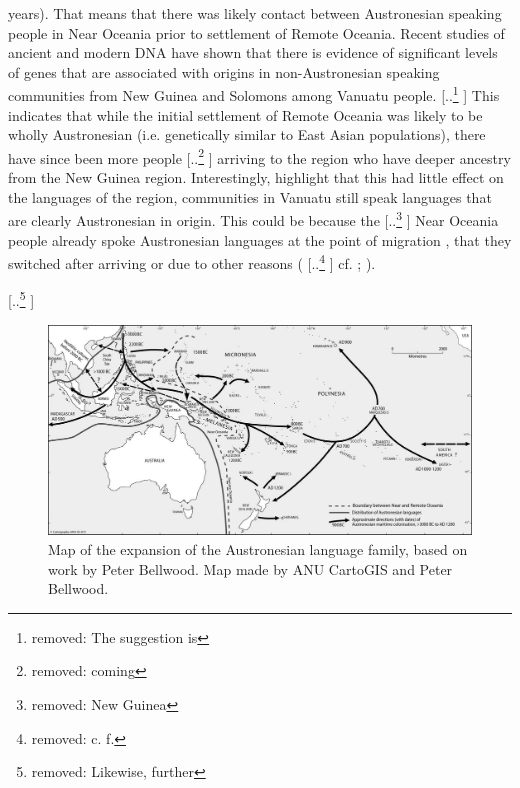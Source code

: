 \documentclass[unnumsec,webpdf,modern,medium]{oup-authoring-template}
\providecommand{\DIFaddtex}[1]{{\protect\color{blue} \sf #1}} %
\providecommand{\DIFdeltex}[1]{{\protect\color{red} [..\footnote{removed: #1} ]}} %
\providecommand{\DIFaddbegin}{} %
\providecommand{\DIFaddend}{} %
\providecommand{\DIFdelbegin}{} %
\providecommand{\DIFdelend}{} %
\providecommand{\DIFaddFL}[1]{\DIFadd{#1}} %
\providecommand{\DIFadd}[1]{\texorpdfstring{\DIFaddtex{#1}}{#1}} %
\providecommand{\DIFdel}[1]{\texorpdfstring{\DIFdeltex{#1}}{}} %
\newcommand{\DIFscaledelfig}{0.5}
\newlength{\DIFdelgraphicswidth} %
\newlength{\DIFdelgraphicsheight} %
\newcommand{\DIFaddincludegraphics}[2][]{{\color{blue}\fbox{\DIFOincludegraphics[#1]{#2}}}} %
\newcommand{\DIFdelincludegraphics}[2][]{%
\sbox{\DIFdelgraphicsbox}{\DIFOincludegraphics[#1]{#2}}%
\settoboxwidth{\DIFdelgraphicswidth}{\DIFdelgraphicsbox} %
\settoboxtotalheight{\DIFdelgraphicsheight}{\DIFdelgraphicsbox} %
\scalebox{\DIFscaledelfig}{%
\parbox[b]{\DIFdelgraphicswidth}{\usebox{\DIFdelgraphicsbox}\\[-\baselineskip] \rule{\DIFdelgraphicswidth}{0em}}\llap{\resizebox{\DIFdelgraphicswidth}{\DIFdelgraphicsheight}{%
\setlength{\unitlength}{\DIFdelgraphicswidth}%
\begin{picture}(1,1)%
\thicklines\linethickness{2pt} %
{\color[rgb]{1,0,0}\put(0,0){\framebox(1,1){}}}%
{\color[rgb]{1,0,0}\put(0,0){\line( 1,1){1}}}%
{\color[rgb]{1,0,0}\put(0,1){\line(1,-1){1}}}%
\end{picture}%
}\hspace*{3pt}}} %
} %
\DeclareRobustCommand{\DIFaddbegin}{\DIFOaddbegin \let\includegraphics\DIFaddincludegraphics} %
\DeclareRobustCommand{\DIFaddend}{\DIFOaddend \let\includegraphics\DIFOincludegraphics} %
\DeclareRobustCommand{\DIFdelbegin}{\DIFOdelbegin \let\includegraphics\DIFdelincludegraphics} %
\DeclareRobustCommand{\DIFdelend}{\DIFOaddend \let\includegraphics\DIFOincludegraphics} %
\begin{document}
\DIFdelend \DIFaddbegin \DIFadd{000 years). That means that there was likely contact between Austronesian speaking people in Near Oceania prior to settlement of Remote Oceania. }\DIFaddend Recent studies of ancient and modern DNA \citep{lipson_harvad_ancient_dna_vanuatu_2018, posth_jena_ancient_dna_vanuatu_2018} have shown that there is evidence of significant levels of genes that are associated with origins in non-Austronesian speaking communities from New Guinea and Solomons among Vanuatu people. \DIFdelbegin \DIFdel{The suggestion is }\DIFdelend \DIFaddbegin \DIFadd{This indicates }\DIFaddend that while the initial settlement of Remote Oceania was likely to be wholly Austronesian (i.e. genetically similar to East Asian populations), there have since been more people \DIFdelbegin \DIFdel{coming }\DIFdelend \DIFaddbegin \DIFadd{arriving to the region }\DIFaddend who have deeper ancestry from the New Guinea region. Interestingly, \citet{posth_jena_ancient_dna_vanuatu_2018} highlight that this had little effect on the languages of the region, communities in Vanuatu still speak languages that are clearly Austronesian in origin. This could be because the \DIFdelbegin \DIFdel{New Guinea }\DIFdelend \DIFaddbegin \DIFadd{Near Oceania }\DIFaddend people already spoke Austronesian languages at the point of migration\DIFaddbegin \DIFadd{, that they switched after arriving }\DIFaddend or due to other reasons (\DIFdelbegin \DIFdel{c. f. }\DIFdelend \DIFaddbegin \DIFadd{cf. }\DIFaddend \citet[288, 321]{barlow2023papuan}; \citet[209-210]{bedford2018ancient}).

\DIFdelbegin \DIFdel{Likewise, further }\DIFdelend \DIFaddbegin \begin{figure}[ht]
\centering
\includegraphics[width=\textwidth]{ANU_cartography.jpg}
\caption{\DIFaddFL{Map of the expansion of the Austronesian language family, based on work by Peter Bellwood. Map made by ANU CartoGIS and Peter Bellwood.}}
\label{austro_expansion_bellwood}
\end{figure}
\end{document}
